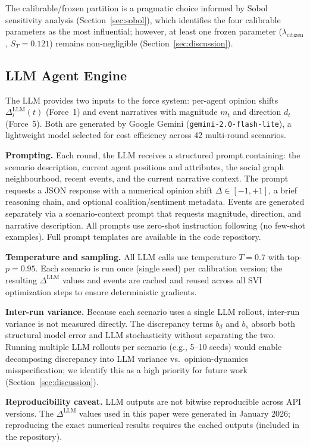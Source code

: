 \documentclass[12pt]{article}
\begin{document}
The calibrable/frozen partition is a pragmatic choice informed by Sobol sensitivity analysis (Section~\ref{sec:sobol}), which identifies the four calibrable parameters as the most influential; however, at least one frozen parameter ($\lambda_{\text{citizen}}$, $S_T = 0.121$) remains non-negligible (Section~\ref{sec:discussion}).

\subsection{LLM Agent Engine}
\label{sec:llm_methodology}

The LLM provides two inputs to the force system: per-agent opinion shifts $\Delta_i^{\text{LLM}}(t)$ (Force~1) and event narratives with magnitude $m_t$ and direction $d_t$ (Force~5). Both are generated by Google Gemini (\texttt{gemini-2.0-flash-lite}), a lightweight model selected for cost efficiency across 42 multi-round scenarios.

\textbf{Prompting.} Each round, the LLM receives a structured prompt containing: the scenario description, current agent positions and attributes, the social graph neighbourhood, recent events, and the current narrative context. The prompt requests a JSON response with a numerical opinion shift $\Delta \in [-1, +1]$, a brief reasoning chain, and optional coalition/sentiment metadata. Events are generated separately via a scenario-context prompt that requests magnitude, direction, and narrative description. All prompts use zero-shot instruction following (no few-shot examples). Full prompt templates are available in the code repository.

\textbf{Temperature and sampling.} All LLM calls use temperature $T = 0.7$ with top-$p = 0.95$. Each scenario is run once (single seed) per calibration version; the resulting $\Delta^{\text{LLM}}$ values and events are cached and reused across all SVI optimization steps to ensure deterministic gradients.

\textbf{Inter-run variance.} Because each scenario uses a single LLM rollout, inter-run variance is not measured directly. The discrepancy terms $b_d$ and $b_s$ absorb both structural model error and LLM stochasticity without separating the two. Running multiple LLM rollouts per scenario (e.g., 5--10 seeds) would enable decomposing discrepancy into LLM variance vs.\ opinion-dynamics misspecification; we identify this as a high priority for future work (Section~\ref{sec:discussion}).

\textbf{Reproducibility caveat.} LLM outputs are not bitwise reproducible across API versions. The $\Delta^{\text{LLM}}$ values used in this paper were generated in January 2026; reproducing the exact numerical results requires the cached outputs (included in the repository).
\end{document}
